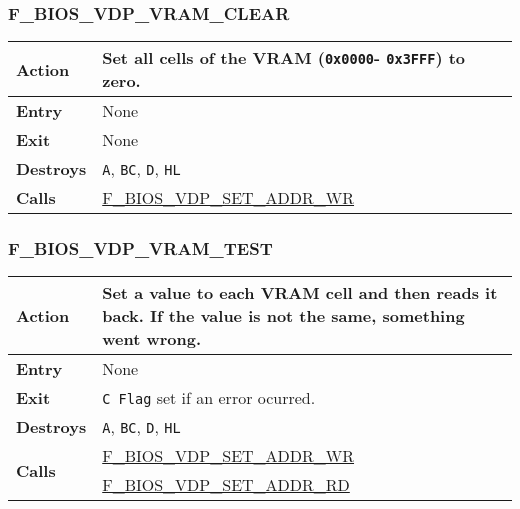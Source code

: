         \subsubsection{F\_BIOS\_VDP\_VRAM\_CLEAR}
        \label{func:fbiosvdpvramclear}
        \begin{tabular}{l p{9cm}}
            \hline\textbf{Action}
            & Set all cells of the \textbf{VRAM} (\texttt{0x0000}-
            \texttt{0x3FFF}) to zero. \\
            \hline\textbf{Entry} & None\\
            \hline\textbf{Exit} & None\\
            \hline\textbf{Destroys} & \texttt{A}, \texttt{BC}, \texttt{D},
            \texttt{HL} \\
            \hline\textbf{Calls} & \hyperref[func:fbiosvdpsetaddrwr]
            {F\_BIOS\_VDP\_SET\_ADDR\_WR}\\
            \hline
        \end{tabular}

        \subsubsection{F\_BIOS\_VDP\_VRAM\_TEST}
        \label{func:fbiosvdpvramtest}
        \begin{tabular}{l p{9cm}}
            \hline\textbf{Action}
            & Set a value to each \textbf{VRAM} cell and then reads it back. If
            the value is not the same, something went wrong. \\
            \hline\textbf{Entry} & None\\
            \hline\textbf{Exit} & \texttt{C Flag} set if an error ocurred.\\
            \hline\textbf{Destroys} & \texttt{A}, \texttt{BC}, \texttt{D},
            \texttt{HL} \\
            \hline\multirow[t]{2}{4em}{\textbf{Calls}}
            & \hyperref[func:fbiosvdpsetaddrwr]{F\_BIOS\_VDP\_SET\_ADDR\_WR}\\
            & \hyperref[func:fbiosvdpsetaddrrd]{F\_BIOS\_VDP\_SET\_ADDR\_RD}\\
            \hline
        \end{tabular}

